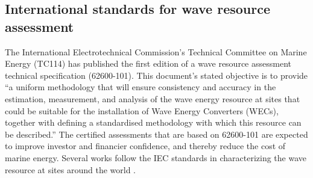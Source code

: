 \subsection{International standards for wave resource assessment}


The International Electrotechnical Commission's Technical Committee on
Marine Energy (TC114) has published the first edition of a wave
resource assessment technical specification (62600-101). This document's stated objective is to provide ``a uniform
methodology that will ensure consistency and accuracy in the
estimation, measurement, and analysis of the wave energy resource at
sites that could be suitable for the installation of Wave Energy
Converters (WECs), together with defining a standardised methodology
with which this resource can be described.'' The certified assessments
that are based on 62600-101 are expected to improve investor and
financier confidence, and thereby reduce the cost of marine
energy. Several works follow the IEC standards in characterizing the
wave resource at sites around the world
\citep{zhengAssessingChinaSea2013,neillWavePowerVariability2013,iglesiasWaveEnergyPotential2009,sierraWaveEnergyResource2013,robertsonCharacterizingShoreWave2014,internationalelectrotechnicalcommissionPart101Wave2015,yangCharacteristicsVariabilityNearshore2020,lokuliyana_sri_2020}.

